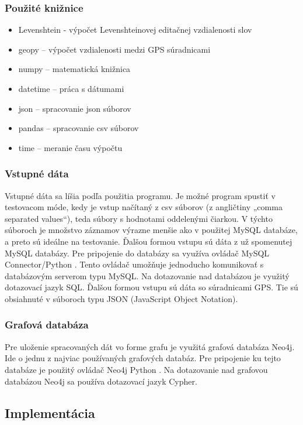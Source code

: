 \subsubsection{Použité knižnice}
\begin{itemize}
    \item Levenshtein - výpočet Levenshteinovej editačnej vzdialenosti slov
    \item geopy – výpočet vzdialenosti medzi GPS súradnicami
    \item numpy – matematická knižnica
    \item datetime – práca s dátumami
    \item json – spracovanie json súborov
    \item pandas – spracovanie csv súborov
    \item time – meranie času výpočtu
\end{itemize}

\subsubsection{Vstupné dáta}

Vstupné dáta sa líšia podľa použitia programu. Je možné program spustiť v testovacom
móde, kedy je vstup načítaný z csv súborov (z angličtiny „comma separated values“), teda
súbory s hodnotami oddelenými čiarkou. V týchto súboroch je množstvo záznamov výrazne
menšie ako v použitej MySQL databáze, a preto sú ideálne na testovanie. Ďalšou formou
vstupu sú dáta z už spomenutej MySQL databázy. Pre pripojenie do databázy sa využíva
ovládač MySQL Connector/Python \cite{mysql}. Tento ovládač umožňuje jednoducho komunikovať s
databázovým serverom typu MySQL. Na dotazovanie nad databázou je využitý dotazovací
jazyk SQL. Ďalšou formou vstupu sú dáta so súradnicami GPS. Tie sú obsiahnuté
v súboroch typu JSON (JavaScript Object Notation).

\subsubsection{Grafová databáza}

Pre uloženie spracovaných dát vo forme grafu je využitá grafová databáza Neo4j. Ide
o jednu z najviac používaných grafových databáz. Pre pripojenie ku tejto databáze je použitý
ovládač Neo4j Python \cite{neo4j}. Na dotazovanie nad grafovou databázou Neo4j sa používa
dotazovací jazyk Cypher.

\subsection{Implementácia}

